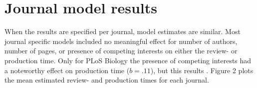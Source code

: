 \section*{Journal model results}
When the results are specified per journal, model estimates are similar. Most journal specific models included no meaningful effect for number of authors, number of pages, or presence of competing interests on either the review- or production time. Only for PLoS Biology the presence of competing interests had a noteworthy effect on production time ($b=.11$), but this results . Figure 2 plots the mean estimated review- and production times for each journal.